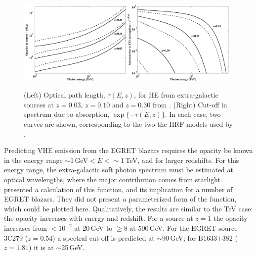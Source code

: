 \begin{figure}[t]
\hspace*{\fill}\includegraphics[angle=270,width=0.49\textwidth]{plots/chap-sources/ebl_opacity.pdf}\hspace*{\fill}\includegraphics[angle=270,width=0.49\textwidth]{plots/chap-sources/ebl_spectrum.pdf}\hspace*{\fill}
\caption{\label{FIG::SOURCES::EBL} (Left) Optical path length, $\tau(E,z)$,
for HE \Grays from extra-galactic sources at $z=0.03$, $z=0.10$ and
$z=0.30$ from \citet{REF::STECKER_DEJAGER::AA1998}. (Right) Cut-off in
\Gray spectrum due to absorption, $\exp\{-\tau(E,z)\}$. In each case,
two curves are shown, corresponding to the two the IIRF models used by
\citet{REF::STECKER_DEJAGER::AA1998}.}
\end{figure}

Predicting VHE emission from the EGRET blazars requires the
opacity be known in the energy range $\sim$1\,GeV$<E<\sim$1\,TeV, and
for larger redshifts. For this energy range, the extra-galactic soft
photon spectrum must be estimated at optical wavelengths, where the
major contribution comes from
starlight. \citet{REF::SALAMON_STECKER::APJ1998} presented a
calculation of this function, and its implication for a number of
EGRET blazars. They did not present a parameterized form of the
function, which could be plotted here. Qualitatively, the results are
similar to the TeV case: the opacity increases with energy and
redshift. For a source at $z=1$ the opacity increases from $<10^{-2}$
at 20\,GeV to $\geq8$ at 500\,GeV. For the EGRET source 3C279
($z=0.54$) a spectral cut-off is predicted at $\sim$90\,GeV; for B1633$+$382
($z=1.81$) it is at $\sim$25\,GeV.

